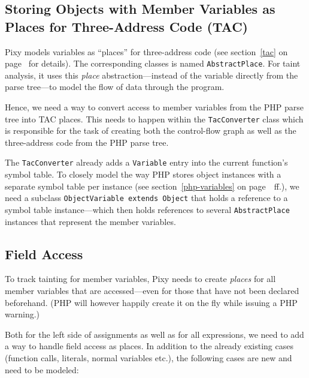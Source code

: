 \subsection{Storing Objects with Member Variables as Places for Three-Address Code (TAC)}

Pixy models variables as ``places'' for three-address code (see section~\ref{tac} on page~\pageref{tac} for details). The corresponding classes is named \texttt{AbstractPlace}. For taint analysis, it uses this \emph{place} abstraction---instead of the variable directly from the parse tree---to model the flow of data through the program.

Hence, we need a way to convert access to member variables from the PHP parse tree into TAC places. This needs to happen within the \texttt{TacConverter} class which is responsible for the task of creating both the control-flow graph as well as the three-address code from the PHP parse tree.

The \texttt{TacConverter} already adds a \texttt{Variable} entry into the current function's symbol table. To closely model the way PHP stores object instances with a separate symbol table per instance (see section~\ref{php-variables} on page~\pageref{php-variables}~ff.), we need a subclass \texttt{ObjectVariable extends Object} that holds a reference to a symbol table instance---which then holds references to several \texttt{AbstractPlace} instances that represent the member variables.


\subsection{Field Access}

To track tainting for member variables, Pixy needs to create \emph{places} for all member variables that are accessed---even for those that have not been declared beforehand. (PHP will however happily create it on the fly while issuing a PHP warning.)

Both for the left side of assignments as well as for all expressions, we need to add a way to handle field access as places. In addition to the already existing cases (\eg function calls, literals, normal variables etc.), the following cases are new and need to be modeled:

